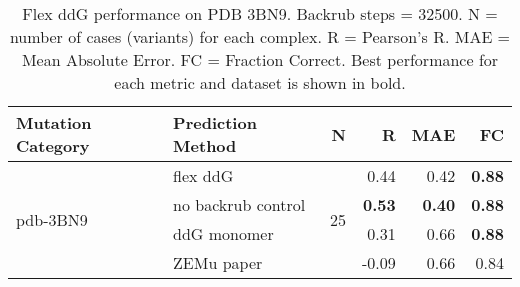 \begin{table}
  \begin{tabular}{llrrrr}
\toprule
Mutation Category &   Prediction Method &   N &     R &  MAE &   FC \\
\midrule
 \multirow{ 4}{*}{pdb-3BN9} & flex ddG & \multirow{ 4}{*}{25} & 0.44 & 0.42 & \textbf{0.88}  \\
 & no backrub control & & \textbf{0.53} & \textbf{0.40} & \textbf{0.88}  \\
 & ddG monomer & & 0.31 & 0.66 & \textbf{0.88}  \\
 & ZEMu paper & & -0.09 & 0.66 & 0.84  \\
\bottomrule
\end{tabular}
  \caption[Flex ddG performance on PDB 3BN9]{
    Flex ddG performance on PDB 3BN9. Backrub steps = 32500. N = number of cases (variants) for each complex. R = Pearson's R. MAE = Mean Absolute Error. FC = Fraction Correct. Best performance for each metric and dataset is shown in bold.
  } \label{tab:table-pdb-3BN9}
\end{table}
